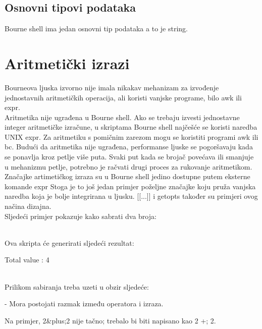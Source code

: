 \documentclass[11pt]{book}
\begin{document}
\subsection{Osnovni tipovi podataka}

Bourne shell ima jedan osnovni tip podataka a to je string.


\section{Aritmetički izrazi}

Bourneova ljuska izvorno nije imala nikakav mehanizam za izvođenje jednostavnih aritmetičkih operacija, ali koristi vanjske programe, bilo awk ili expr.\\
Aritmetika nije ugrađena u Bourne shell. Ako se trebaju izvesti jednostavne integer aritmetičke izračune, u skriptama Bourne shell najčešće se koristi naredba UNIX expr. Za aritmetiku s pomičnim zarezom mogu se koristiti programi awk ili bc. Budući da aritmetika nije ugrađena, performanse ljuske se pogoršavaju kada se ponavlja kroz petlje više puta. Svaki put kada se brojač povećava ili smanjuje u mehanizmu petlje, potrebno je račvati drugi proces za rukovanje aritmetikom.
Značajke artimetičkog izraza su u Bourne shell jedino dostupne putem eksterne komande expr 
Stoga je to još jedan primjer poželjne značajke koju pruža vanjska naredba koja je bolje integrirana u ljusku. [[...]] i getopts također su primjeri ovog načina dizajna.\\

Sljedeći primjer pokazuje kako sabrati dva broja:\\

\\

Ova skripta će generirati sljedeći rezultat:\\

\begin{shortlisting}
Total value : 4
\end{shortlisting}\\

Prilikom sabiranja treba uzeti u obzir sljedeće:

- Mora postojati razmak između operatora i izraza. 

  Na primjer, 2\&plus;2 nije tačno; trebalo bi biti napisano kao 2 +; 2. 
  
\end{document}
